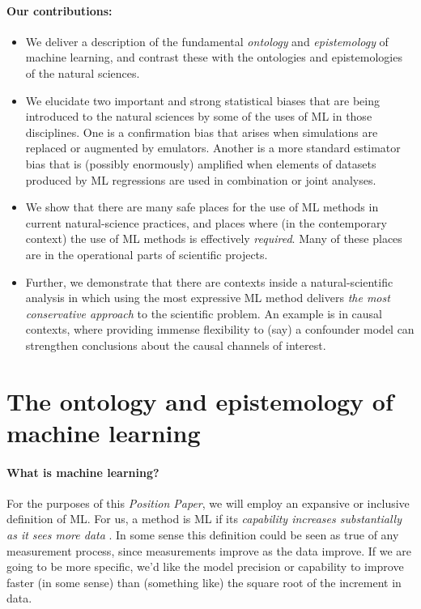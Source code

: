 \documentclass[11pt]{article}
\newcommand{\documentname}{\textsl{Position Paper}}
\begin{document}
\paragraph{Our contributions:}
\begin{itemize}
  \item We deliver a description of the fundamental \emph{ontology} and \emph{epistemology} of machine learning, and contrast these with the ontologies and epistemologies of the natural sciences.
  \item We elucidate two important and strong statistical biases that are being introduced to the natural sciences by some of the uses of ML in those disciplines. One is a confirmation bias that arises when simulations are replaced or augmented by emulators. Another is a more standard estimator bias that is (possibly enormously) amplified when elements of datasets produced by ML regressions are used in combination or joint analyses.
  \item We show that there are many safe places for the use of ML methods in current natural-science practices, and places where (in the contemporary context) the use of ML methods is effectively \emph{required}. Many of these places are in the operational parts of scientific projects.
  \item Further, we demonstrate that there are contexts inside a natural-scientific analysis in which using the most expressive ML method delivers \emph{the most conservative approach} to the scientific problem. An example is in causal contexts, where providing immense flexibility to (say) a confounder model can strengthen conclusions about the causal channels of interest.
\end{itemize}

\section{The ontology and epistemology of machine learning}\label{sec:philosophy}

\paragraph{What is machine learning?}
For the purposes of this \documentname, we will employ an expansive or inclusive definition of ML.
For us, a method is ML if its \emph{capability increases substantially as it sees more data} \cite{ml_definition}.
In some sense this definition could be seen as true of any measurement process, since measurements improve as the data improve. 
If we are going to be more specific, we'd like the model precision or capability to improve faster (in some sense) than (something like) the square root of the increment in data.
\end{document}
